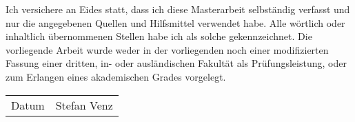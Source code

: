 \newcommand{\theauthor}{Stefan Venz}
\pagestyle{empty}

\setlength{\parindent}{0in}
Ich versichere an Eides statt, dass ich diese Masterarbeit selbständig verfasst und nur die angegebenen Quellen und Hilfsmittel verwendet habe.
%
Alle wörtlich oder inhaltlich übernommenen Stellen habe ich als solche gekennzeichnet.
%
Die vorliegende Arbeit wurde weder in der vorliegenden noch einer modifizierten Fassung einer dritten, in- oder ausländischen Fakultät als Prüfungsleistung, oder zum Erlangen eines akademischen Grades vorgelegt.

\vspace{1cm}

\begin{flushright}
	\begin{tabular}{p{2cm}p{6cm}}
		\hline
		Datum & \theauthor
		\smallskip
	\end{tabular}
\end{flushright}
